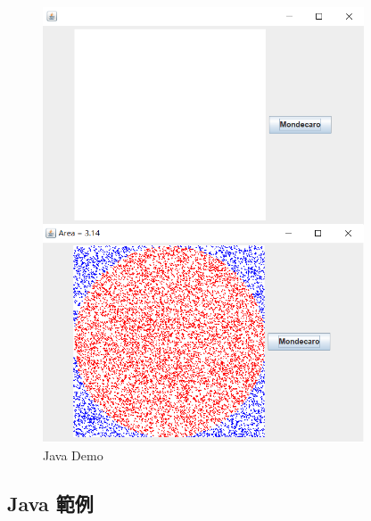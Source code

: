 \documentclass[10pt,UTF8]{ctexart}
\begin{document}
\begin{figure}[H]
\centering 
\includegraphics[width=0.85\textwidth]{w15-lab-1.png} 
\caption{Java Demo}
\label{Test}
\end{figure}

\subsection{Java 範例}
\end{document}
